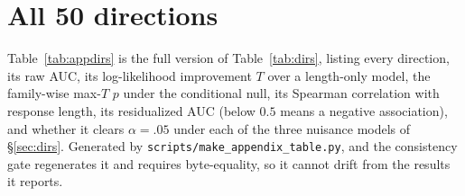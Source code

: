 \section{All 50 directions}
\label{app:dirs}

Table~\ref{tab:appdirs} is the full version of Table~\ref{tab:dirs}, listing every
direction, its raw AUC, its log-likelihood improvement $T$ over a length-only model,
the family-wise max-$T$ $p$ under the conditional null, its Spearman correlation
with response length, its residualized AUC (below $0.5$ means a negative
association), and whether it clears $\alpha = .05$ under each of the three
nuisance models of \S\ref{sec:dirs}. Generated by
\texttt{scripts/make\_appendix\_table.py}, and the consistency gate regenerates it
and requires byte-equality, so it cannot drift from the results it reports.

